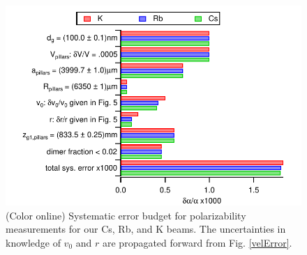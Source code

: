 \documentclass[twocolumn,prl,showpacs,superscriptaddress]{revtex4-1}   %
\newcommand{\figref}[1]{Fig. \ref{#1}}
\newcommand{\sigv}{ASDFASDFASDF}
\newcommand{\sigr}{ASDFASDFASDFA}
\begin{document}
\begin{figure}
\includegraphics[width=\linewidth,keepaspectratio]{displayPolErrors.pdf}
\caption{\label{polError}(Color online) Systematic error budget for polarizability measurements for our Cs, Rb, and K beams. The uncertainties in knowledge of $v_0$ and $r$ are propagated forward from \figref{velError}.}
\end{figure}

\end{document}
